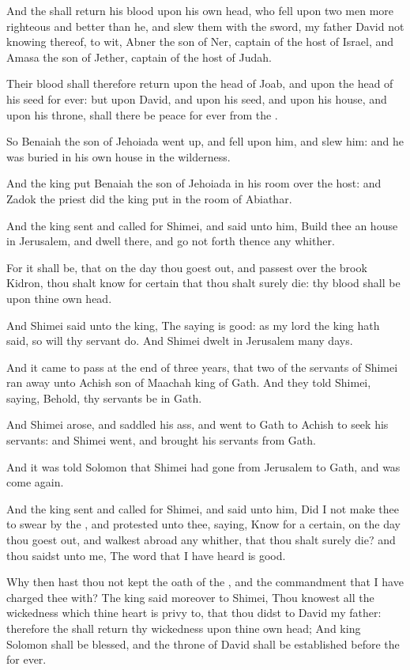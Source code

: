 \Verse And the \LORD shall return his blood upon his own head, who fell upon two men more righteous and better than he, and slew them with the sword, my father David not knowing thereof, to wit, Abner the son of Ner, captain of the host of Israel, and Amasa the son of Jether, captain of the host of Judah.

\Verse Their blood shall therefore return upon the head of Joab, and upon the head of his seed for ever: but upon David, and upon his seed, and upon his house, and upon his throne, shall there be peace for ever from the \LORD.

\Verse So Benaiah the son of Jehoiada went up, and fell upon him, and slew him: and he was buried in his own house in the wilderness.

\Verse And the king put Benaiah the son of Jehoiada in his room over the host: and Zadok the priest did the king put in the room of Abiathar.

\Verse And the king sent and called for Shimei, and said unto him, Build thee an house in Jerusalem, and dwell there, and go not forth thence any whither.

\Verse For it shall be, that on the day thou goest out, and passest over the brook Kidron, thou shalt know for certain that thou shalt surely die: thy blood shall be upon thine own head.

\Verse And Shimei said unto the king, The saying is good: as my lord the king hath said, so will thy servant do. And Shimei dwelt in Jerusalem many days.

\Verse And it came to pass at the end of three years, that two of the servants of Shimei ran away unto Achish son of Maachah king of Gath.  And they told Shimei, saying, Behold, thy servants be in Gath.

\Verse And Shimei arose, and saddled his ass, and went to Gath to Achish to seek his servants: and Shimei went, and brought his servants from Gath.

\Verse And it was told Solomon that Shimei had gone from Jerusalem to Gath, and was come again.

\Verse And the king sent and called for Shimei, and said unto him, Did I not make thee to swear by the \LORD, and protested unto thee, saying, Know for a certain, on the day thou goest out, and walkest abroad any whither, that thou shalt surely die? and thou saidst unto me, The word that I have heard is good.

\Verse Why then hast thou not kept the oath of the \LORD, and the commandment that I have charged thee with?  \Verse The king said moreover to Shimei, Thou knowest all the wickedness which thine heart is privy to, that thou didst to David my father: therefore the \LORD shall return thy wickedness upon thine own head; \Verse And king Solomon shall be blessed, and the throne of David shall be established before the \LORD for ever.

